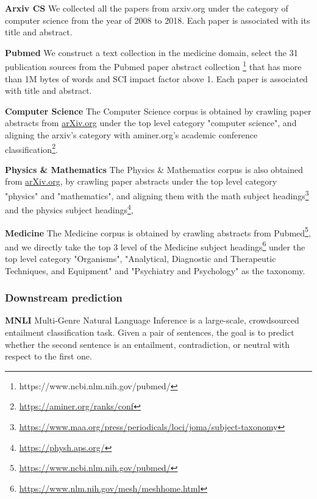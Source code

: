 \noindent \textbf{Arxiv CS}
We collected all the papers from arxiv.org under the category of computer science from the year of 2008 to 2018. Each paper is associated with its title and abstract. 

\noindent \textbf{Pubmed}
We construct a text collection in the medicine domain, 
select the 31 publication sources 
from the Pubmed paper abstract collection \footnote{https://www.ncbi.nlm.nih.gov/pubmed/}
that has more than 1M  bytes of words and SCI impact factor above 1. Each paper is associated with title and abstract.



\noindent \textbf{Computer Science} 
The Computer Science corpus is obtained by crawling paper abstracts from \url{arXiv.org} under the top level category "computer science", and aligning the arxiv's category with aminer.org's academic conference classification\footnote{\url{https://aminer.org/ranks/conf}}.

\noindent \textbf{Physics \& Mathematics} 
The Physics \& Mathematics corpus is also obtained from \url{arXiv.org}, 
by crawling paper abstracts under the top level category "physics" and "mathematics", and aligning them with the math subject headings\footnote{\url{https://www.maa.org/press/periodicals/loci/joma/subject-taxonomy}}
and the physics subject headings\footnote{\url{https://physh.aps.org/}},

\noindent \textbf{Medicine}
The Medicine corpus is obtained by crawling abstracts from Pubmed\footnote{\url{https://www.ncbi.nlm.nih.gov/pubmed/}}, and we directly take the top 3 level of 
the Medicine subject headings\footnote{\url{https://www.nlm.nih.gov/mesh/meshhome.html}} under the top level category "Organisms", "Analytical, Diagnostic and Therapeutic Techniques, and Equipment" and "Psychiatry and Psychology" as the taxonomy.

\subsubsection{Downstream prediction}

\noindent \textbf{MNLI} Multi-Genre Natural Language Inference is a large-scale, crowdsourced entailment classification task. Given a pair of sentences, the goal is to predict whether the second sentence is an entailment, contradiction, or neutral with respect to the first one.

